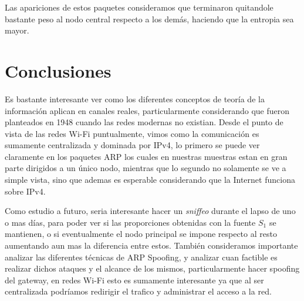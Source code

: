 Las apariciones de estos paquetes consideramos que terminaron quitandole bastante peso al nodo central respecto a los demás, haciendo que la entropia sea mayor.

\section{Conclusiones}

Es bastante interesante ver como los diferentes conceptos de teoría de la información aplican en canales reales, particularmente considerando que fueron planteados en 1948 cuando las redes modernas no existian. Desde el punto de vista de las redes Wi-Fi puntualmente, vimos como la comunicación es sumamente centralizada y dominada por IPv4, lo primero se puede ver claramente en los paquetes ARP los cuales en nuestras muestras estan en gran parte dirigidos a un único nodo, mientras que lo segundo no solamente se ve a simple vista, sino que ademas es esperable considerando que la Internet funciona sobre IPv4.

Como estudio a futuro, seria interesante hacer un \textit{sniffeo} durante el lapso de uno o mas días, para poder ver si las proporciones obtenidas con la fuente $S_1$ se mantienen, o si eventualmente el nodo principal se impone respecto al resto aumentando aun mas la diferencia entre estos. También consideramos importante analizar las diferentes técnicas de ARP Spoofing, y analizar cuan factible es realizar dichos ataques y el alcance de los mismos, particularmente hacer spoofing del gateway, en redes Wi-Fi esto es sumamente interesante ya que al ser centralizada podríamos redirigir el trafico y administrar el acceso a la red.
%
%
